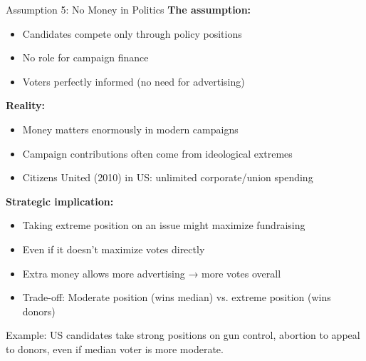 \documentclass[10pt]{beamer}
\begin{document}
\begin{frame}[allowframebreaks]{Assumption 5: No Money in Politics}
\textbf{The assumption:}
\begin{itemize}
\item Candidates compete only through policy positions
\item No role for campaign finance
\item Voters perfectly informed (no need for advertising)
\end{itemize}



\textbf{Reality:}
\begin{itemize}
\item \alert{Money matters enormously} in modern campaigns
\item Campaign contributions often come from ideological extremes
\item Citizens United (2010) in US: unlimited corporate/union spending
\end{itemize}

   \framebreak 

\textbf{Strategic implication:}
\begin{itemize}
\item Taking extreme position on an issue might \alert{maximize fundraising}
\item Even if it doesn't maximize votes directly
\item Extra money allows more advertising → more votes overall
\item Trade-off: Moderate position (wins median) vs. extreme position (wins donors)
\end{itemize}



\alert{Example:} US candidates take strong positions on gun control, abortion to appeal to donors, even if median voter is more moderate.
\end{frame}
\end{document}

